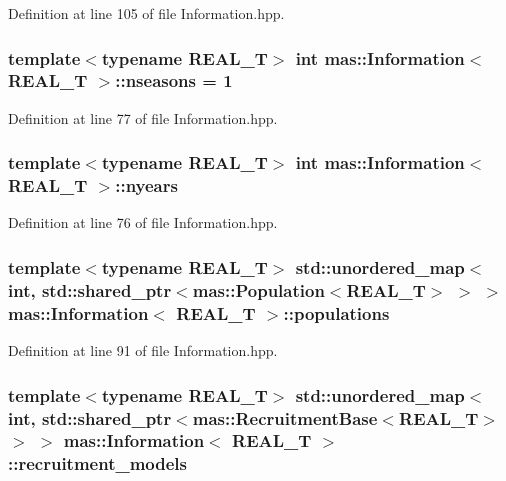 Definition at line 105 of file Information.\-hpp.

\hypertarget{classmas_1_1_information_a454f7c72980b885c8a3f52a651435dde}{
\subsubsection[{nseasons}]{\setlength{\rightskip}{0pt plus 5cm}template$<$typename R\-E\-A\-L\-\_\-\-T$>$ int {\bf mas\-::\-Information}$<$ R\-E\-A\-L\-\_\-\-T $>$\-::nseasons = 1}}\label{classmas_1_1_information_a454f7c72980b885c8a3f52a651435dde}


Definition at line 77 of file Information.\-hpp.

\hypertarget{classmas_1_1_information_aba4d8ca8604985a74a51beb13dae9d55}{
\subsubsection[{nyears}]{\setlength{\rightskip}{0pt plus 5cm}template$<$typename R\-E\-A\-L\-\_\-\-T$>$ int {\bf mas\-::\-Information}$<$ R\-E\-A\-L\-\_\-\-T $>$\-::nyears}}\label{classmas_1_1_information_aba4d8ca8604985a74a51beb13dae9d55}


Definition at line 76 of file Information.\-hpp.

\hypertarget{classmas_1_1_information_aea96825c5714a43ad531811a402d8d39}{
\subsubsection[{populations}]{\setlength{\rightskip}{0pt plus 5cm}template$<$typename R\-E\-A\-L\-\_\-\-T$>$ std\-::unordered\-\_\-map$<$int, std\-::shared\-\_\-ptr$<${\bf mas\-::\-Population}$<$R\-E\-A\-L\-\_\-\-T$>$ $>$ $>$ {\bf mas\-::\-Information}$<$ R\-E\-A\-L\-\_\-\-T $>$\-::populations}}\label{classmas_1_1_information_aea96825c5714a43ad531811a402d8d39}


Definition at line 91 of file Information.\-hpp.

\hypertarget{classmas_1_1_information_ad540badf665ee856a5de0e4da0bb2e5e}{
\subsubsection[{recruitment\-\_\-models}]{\setlength{\rightskip}{0pt plus 5cm}template$<$typename R\-E\-A\-L\-\_\-\-T$>$ std\-::unordered\-\_\-map$<$int, std\-::shared\-\_\-ptr$<${\bf mas\-::\-Recruitment\-Base}$<$R\-E\-A\-L\-\_\-\-T$>$ $>$ $>$ {\bf mas\-::\-Information}$<$ R\-E\-A\-L\-\_\-\-T $>$\-::recruitment\-\_\-models}}\label{classmas_1_1_information_ad540badf665ee856a5de0e4da0bb2e5e}


